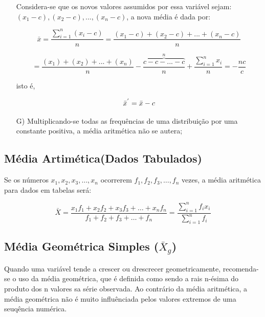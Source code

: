 \begin{enumerate}
Considera-se que os novos valores assumidos por essa variável sejam: $(x_{1}-c),(x_{2}-c),...,(x_{n}-c)$, a nova média é dada por:

\begin{equation}\label{media3}
     \bar{x}= \frac{\sum_{i=1}^{n}(x_{i}-c)}{n}=\frac{(x_{1}-c)+(x_{2}-c)+...+(x_{n}-c)}{n} 
\end{equation}

\begin{equation*}\label{media4}
  =\frac{(x_{1})+(x_{2})+...+(x_{n})}{n}- \overbrace{\frac{c-c-...-c}{n}}^{n}+\frac{\sum_{i=1}^{n}x_{i}}{n}=- \frac{nc}{c}
\end{equation*}

isto é, 

$$\Bar{x}^{'}=\Bar{x}-c$$




\item [{G)}]Multiplicando-se todas as frequências de uma distribuição por uma constante positiva, a média aritmética não se autera; 
\end{enumerate}















\subsection{Média Artimética(Dados Tabulados)}

Se os números $x_{1},x_{2},x_{3},\ldots, x_{n}$ ocorrerem $f_{1}, f_{2}, f_{3}, \ldots, f_{n}$ vezes, a média aritmética para dados em tabelas será:


\begin{equation}\label{media2}
     \bar{X}= \frac{x_{1}f_{1}+x_{2}f_{2}+x_{3}f_{3}+
 \ldots+x_{n}f_{n}}{f_{1}+f_{2}+f_{3}+\ldots+f_{n}} = \frac{\sum_{i=1}^{n}f_{i}x_{i}}{\sum_{i=1}^{n}f_{i}}
\end{equation}

\subsection{Média Geométrica Simples ($\bar{X}_{g}$)}

Quando uma variável tende a crescer ou drescrecer geometricamente, recomenda-se o uso da média geométrica, que é definida como sendo a rais n-ésima do produto dos n valores sa série observada. Ao contrário da média aritmética, a média geométrica não é muito influênciada pelos valores extremos de uma seuqência numérica.\vskip0.3cm


